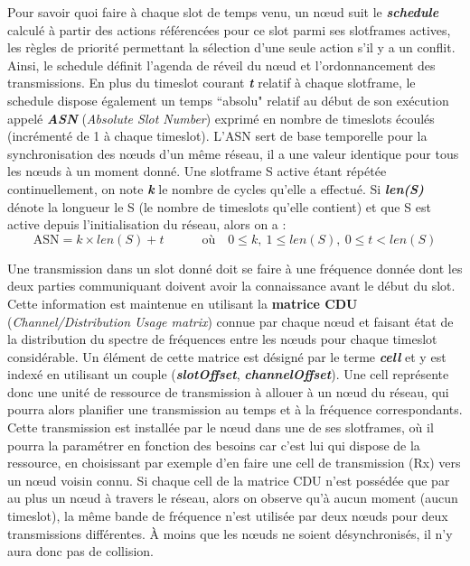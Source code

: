 \documentclass[]{report}
\begin{document}
\par Pour savoir quoi faire à chaque slot de temps venu, un nœud suit le \textbf{\textit{schedule}} calculé à partir des actions référencées pour ce slot parmi ses slotframes actives, les règles de priorité permettant la sélection d'une seule action s'il y a un conflit. Ainsi, le schedule définit l'agenda de réveil du nœud et l'ordonnancement des transmissions. En plus du timeslot courant \textbf{\textit{t}} relatif à chaque slotframe, le schedule dispose également un temps ``absolu" relatif au début de son exécution appelé \textit{\textbf{ASN}} (\textit{Absolute Slot Number}) exprimé en nombre de timeslots écoulés (incrémenté de 1 à chaque timeslot). L'ASN sert de base temporelle pour la synchronisation des nœuds d'un même réseau, il a une valeur identique pour tous les nœuds à un moment donné. Une slotframe S active étant répétée continuellement, on note \textit{\textbf{k}} le nombre de cycles qu'elle a effectué. Si \textbf{\textit{len(S)}} dénote la longueur le S (le nombre de timeslots qu'elle contient) et que S est active depuis l'initialisation du réseau, alors on a :
\begin{equation}\label{ASNeq}
\text{ASN} = k \times len(S) + t \qquad \quad \text{où} \quad 0 \leq k, \: 1 \leq len(S), \: 0 \leq t < len(S)
\end{equation}


\vspace{0.3cm}

\par Une transmission dans un slot donné doit se faire à une fréquence donnée dont les deux parties communiquant doivent avoir la connaissance avant le début du slot. Cette information est maintenue en utilisant la \textbf{matrice CDU} (\textit{Channel/Distribution Usage matrix}) connue par chaque nœud et faisant état de la distribution du spectre de fréquences entre les nœuds pour chaque timeslot considérable. Un élément de cette matrice est désigné par le terme \textbf{\textit{cell}} et y est indexé en utilisant un couple (\textbf{\textit{slotOffset}}, \textbf{\textit{channelOffset}}). Une cell représente donc une unité de ressource de transmission à allouer à un nœud du réseau, qui pourra alors planifier une transmission au temps et à la fréquence correspondants. Cette transmission est installée par le nœud dans une de ses slotframes, où il pourra la paramétrer en fonction des besoins car c'est lui qui dispose de la ressource, en choisissant par exemple d'en faire une cell de transmission (Rx) vers un nœud voisin connu. Si chaque cell de la matrice CDU n'est possédée que par au plus un nœud à travers le réseau, alors on observe qu'à aucun moment (aucun timeslot), la même bande de fréquence n'est utilisée par deux nœuds pour deux transmissions différentes. À moins que les nœuds ne soient désynchronisés, il n'y aura donc pas de collision. 
\end{document}
